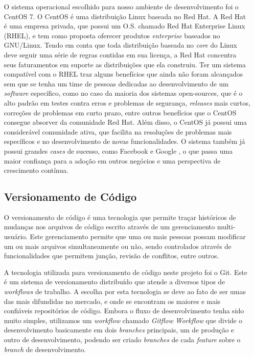 O sistema operacional escolhido para nosso ambiente de desenvolvimento foi o CentOS 7. O CentOS é uma distribuição Linux baseada no Red Hat. A Red Hat é uma empresa privada, que possui um O.S. chamado Red Hat Enterprise Linux (RHEL), e tem como proposta oferecer produtos \textit{enterprise} baseados no GNU/Linux. Tendo em conta que toda distribuição baseada no \textit{core} do Linux deve seguir uma série de regras contidas em sua licença, a Red Hat concentra seus faturamentos em suporte as distribuições que ela construiu. Ter um sistema compatível com o RHEL traz alguns benefícios que ainda não foram alcançados sem que se tenha um time de pessoas dedicadas ao desenvolvimento de um \textit{software} específico, como no caso da maioria dos sistemas open-sources, que é o alto padrão em testes contra erros e problemas de segurança, \textit{releases} mais curtos, correções de problemas em curto prazo, entre outros benefícios que o CentOS consegue absorver da comunidade Red Hat. Além disso, o CentOS já possui uma considerável comunidade ativa, que facilita na resoluções de problemas mais específicos e no desenvolvimento de novas funcionalidades. O sistema também já possui grandes \textit{cases} de sucesso, como Facebook \cite{facebook-distro} e Google \cite{google-redhat}, o que passa uma maior confiança para a adoção em outros negócios e uma perspectiva de crescimento contínua.

\subsection{Versionamento de Código}
O versionamento de código é uma tecnologia que permite traçar históricos de mudanças nos arquivos de código escrito através de um gerenciamento multi-usuário. Este gerenciamento permite que uma ou mais pessoas possam modificar um ou mais arquivos simultaneamente ou não, sendo controlados através de funcionalidades que permitem junção, revisão de conflitos, entre outros.

A tecnologia utilizada para versionamento de código neste projeto foi o Git. Este é um sistema de versionamento distribuído que atende a diversos tipos de \textit{workflows} de trabalho. A escolha por esta tecnologia se deve ao fato de ser umas das mais difundidas no mercado, e onde se encontram os maiores e mais confiáveis repositórios de código. Embora o fluxo de desenvolvimento tenha sido muito simples, utilizamos um \textit{workflow} chamado \textit{Gitflow Workflow} \cite{gitflow} que divide o desenvolvimento basicamente em dois \textit{branches} principais, um de produção e outro de desenvolvimento, podendo ser criado \textit{branches} de cada \textit{feature} sobre o \textit{branch} de desenvolvimento. 

